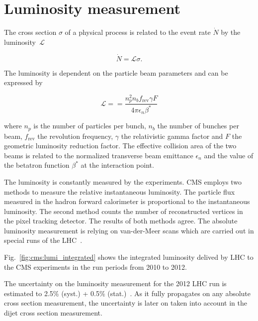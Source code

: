 \section{Luminosity measurement}

The cross section $\sigma$ of a physical process is related to the
event rate $\dot{N}$ by the luminosity~$\mathcal{L}$

\begin{equation*}
    \dot{N} = \mathcal{L} \sigma.
\end{equation*}

The luminosity is dependent on the particle beam parameters and can be expressed
by

\begin{equation*}
    \mathcal{L} = = \frac{n_p^2
        n_b f_\mathrm{rev} \gamma F}{4 \pi \epsilon_n \beta^*}
\end{equation*}

where $n_p$ is the number of particles per bunch, $n_b$ the number of bunches
per beam, $f_\mathrm{rev}$ the revolution frequency, $\gamma$ the relativistic
gamma factor and $F$ the geometric luminosity reduction factor. The effective
collision area of the two beams is related to the normalized transverse beam
emittance $\epsilon_n$ and the value of the betatron function $\beta^*$ at the
interaction point.

The luminosity is constantly measured by the experiments. CMS employs two
methods to measure the relative instantaneous luminosity. The particle flux
measured in the hadron forward calorimeter is proportional to the instantaneous
luminosity. The second method counts the number of reconstructed vertices in the pixel
tracking detector. The results of both methods agree. The absolute luminosity
measurement is relying on van-der-Meer scans which are carried out in special
runs of the LHC~\cite{vanderMeer:296752}.

Fig.~\ref{fig:cms:lumi_integrated} shows the integrated luminosity delived by
LHC to the CMS experiments in the run periods from 2010 to 2012.

The uncertainty on the luminosity measurement for the 2012 LHC run is estimated
to 2.5\% (syst.) + 0.5\% (stat.)~\cite{CMS-PAS-LUM-13-001}. As it fully
propagates on any absolute cross section measurement, the uncertainty is later
on taken into account in the dijet cross section measurement.

